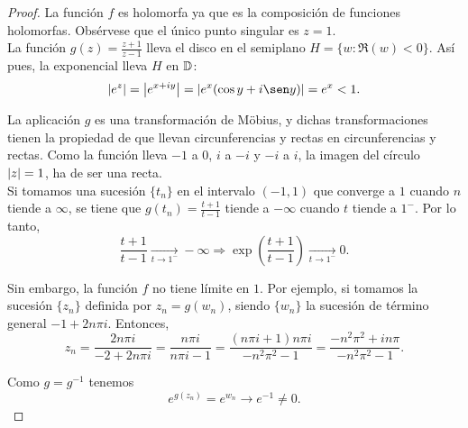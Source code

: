 \begin{proof}
    La función $f$ es holomorfa ya que es la composición de funciones holomorfas. Obsérvese que el único punto singular es $z = 1$. \\

    La función $g(z) = \frac{z + 1}{z - 1}$ lleva el disco en el semiplano $H = \{w: \Re (w) < 0\}$. Así pues, la exponencial lleva $H$ en $\mathbb{D}$:
    \begin{equation*}
        \abs{e^z} = \abs{e^{x+iy}} = \abs{e^{x}(\cos y + i\sen y)} = e^{x} < 1.
    \end{equation*}

    La aplicación $g$ es una transformación de Möbius, y dichas transformaciones tienen la propiedad de que llevan circunferencias y rectas en circunferencias y rectas. Como la función lleva $-1$ a $0$, $i$ a $-i$ y $-i$ a $i$, la imagen del círculo $\left\lvert z\right\rvert=1$, ha de ser una recta. \\

    Si tomamos una sucesión $\{t_n\}$ en el intervalo $(-1,1)$ que converge a $1$ cuando $n$ tiende a $\infty$, se tiene que $g(t_n)  = \frac{t + 1}{t - 1}$ tiende a $- \infty$ cuando $t$ tiende a $1^-$. Por lo tanto,
    \begin{equation*}
        \frac{t + 1}{t - 1} \xrightarrow[t \to 1^-]{}  - \infty \Rightarrow \exp \left(  \frac{t + 1}{t - 1} \right) \xrightarrow[t \to 1^-]{} 0.
    \end{equation*}

    Sin embargo, la función $f$ no tiene límite en $1$. Por ejemplo, si tomamos la sucesión $\{z_n\}$ definida por $z_n = g(w_n)$, siendo $\{w_n\}$ la sucesión de término general $-1 + 2n \pi i$. Entonces,
     \begin{equation*}
         z_n = \frac{2n \pi i}{-2 + 2n \pi i} = \frac{n \pi i}{n \pi i - 1} =  \frac{(n \pi i + 1) n \pi i}{- n^2 \pi^2 - 1} = \frac{-n^2 \pi^2 + i n \pi}{-n^2 \pi^2 - 1}.
     \end{equation*}

     Como $g = g^{-1}$ tenemos
     \begin{equation*}
         e^{g(z_n)} = e^{w_n} \to e^{-1} \not = 0.
     \end{equation*}

\end{proof}

